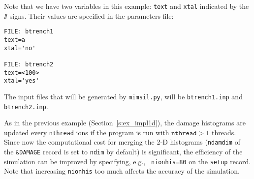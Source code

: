 Note that we have two variables in this example: \texttt{text} and
\texttt{xtal} indicated by the \texttt{\#} signs. Their values are specified in
the parameters file:

\begin{verbatim}
FILE: btrench1
text=a
xtal='no'

FILE: btrench2
text=<100>
xtal='yes'
\end{verbatim}

The input files that will be generated by \texttt{mimsil.py}, will be
\texttt{btrench1.inp} and \texttt{btrench2.inp}.

As in the previous example (Section~\ref{s:ex_impl1d}), the damage
histograms are updated every \texttt{nthread} ions if the program is run with
$\texttt{nthread} > 1$ threads. Since now the computational cost for merging the
2-D histograms (\texttt{ndamdim} of the \texttt{\&DAMAGE} record is set to
\texttt{ndim} by default) is significant, the efficiency of the simulation can
be improved by specifying, e.g., ~\texttt{nionhis=80} on the \texttt{setup}
record. Note that increasing \texttt{nionhis} too much affects the accuracy of
the simulation.
